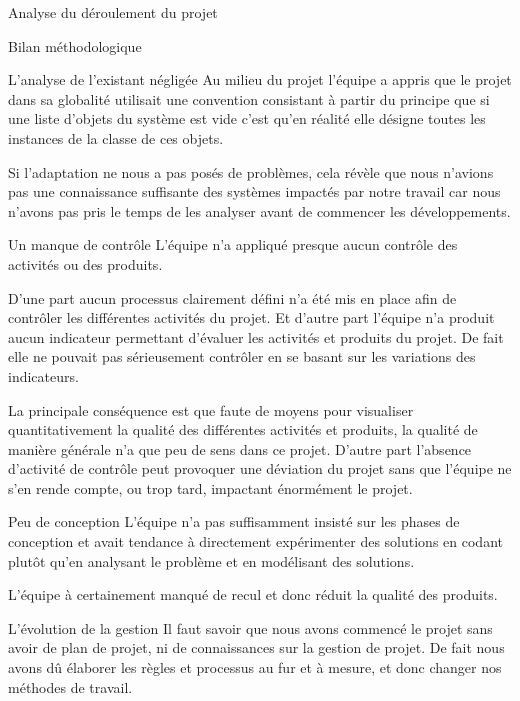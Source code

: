 \documentclass[]{article}
\begin{document}
{\begin{section}{Analyse du déroulement du projet}
 \begin{subsection}{Bilan méthodologique}
     \begin{subsubsection}{L'analyse de l'existant négligée}
         Au milieu du projet l'équipe a appris que le projet dans sa globalité utilisait une convention consistant à partir du principe que si une liste d'objets du système est vide c'est qu'en réalité elle désigne toutes les instances de la classe de ces objets.

         Si l'adaptation ne nous a pas posés de problèmes, cela révèle que nous n'avions pas une connaissance suffisante des systèmes impactés par notre travail car nous n'avons pas pris le temps de les analyser avant de commencer les développements.
     \end{subsubsection}

     \begin{subsubsection}{Un manque de contrôle}
         L'équipe n'a appliqué presque aucun contrôle des activités ou des produits.

         D'une part aucun processus clairement défini n'a été mis en place afin de contrôler les différentes activités du projet. Et d'autre part l'équipe n'a produit aucun indicateur permettant d'évaluer les activités et produits du projet. De fait elle ne pouvait pas sérieusement contrôler en se basant sur les variations des indicateurs.

         La principale conséquence est que faute de moyens pour visualiser quantitativement la qualité des différentes activités et produits, la qualité de manière générale n'a que peu de sens dans ce projet. D'autre part l'absence d'activité de contrôle peut provoquer une déviation du projet sans que l'équipe ne s'en rende compte, ou trop tard, impactant énormément le projet.
     \end{subsubsection}

     \begin{subsubsection}{Peu de conception}
         L'équipe n'a pas suffisamment insisté sur les phases de conception et avait tendance à directement expérimenter des solutions en codant plutôt qu'en analysant le problème et en modélisant des solutions.

         L'équipe à certainement manqué de recul et donc réduit la qualité des produits.
     \end{subsubsection}

     \begin{subsubsection}{L'évolution de la gestion}
         Il faut savoir que nous avons commencé le projet sans avoir de plan de projet, ni de connaissances sur la gestion de projet. De fait nous avons dû élaborer les règles et processus au fur et à mesure, et donc changer nos méthodes de travail.


\end{subsubsection}
\end{subsection}
\end{section}}
\end{document}
